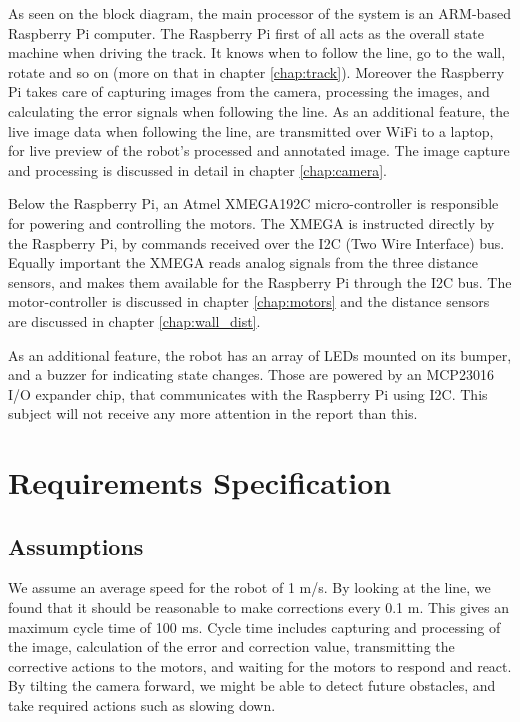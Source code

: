As seen on the block diagram, the main processor of the system is an ARM-based Raspberry Pi computer. The Raspberry Pi first of all acts as the overall state machine when driving the track. It knows when to follow the line, go to the wall, rotate and so on (more on that in chapter \ref{chap:track}). Moreover the Raspberry Pi takes care of capturing images from the camera, processing the images, and calculating the error signals when following the line. As an additional feature, the live image data when following the line, are transmitted over WiFi to a laptop, for live preview of the robot's processed and annotated image. The image capture and processing is discussed in detail in chapter \ref{chap:camera}. 

Below the Raspberry Pi, an Atmel XMEGA192C micro-controller is responsible for powering and controlling the motors. The XMEGA is instructed directly by the Raspberry Pi, by commands received over the I2C (Two Wire Interface) bus. Equally important the XMEGA reads analog signals from the three distance sensors, and makes them available for the Raspberry Pi through the I2C bus. The motor-controller is discussed in chapter \ref{chap:motors} and the distance sensors are discussed in chapter \ref{chap:wall_dist}.

As an additional feature, the robot has an array of LEDs mounted on its bumper, and a buzzer for indicating state changes. Those are powered by an MCP23016 I/O expander chip, that communicates with the Raspberry Pi using I2C. This subject will not receive any more attention in the report than this.

%
%
%
%
\section{Requirements Specification}
\subsection{Assumptions}

We assume an average speed for the robot of 1 m/s. By looking at the line, we found that it should be
reasonable to make corrections every 0.1 m. This gives an maximum cycle time of 100 ms. Cycle
time includes capturing and processing of the image, calculation of the error and correction value,
transmitting the corrective actions to the motors, and waiting for the motors to respond and react.
By tilting the camera forward, we might be able to detect future obstacles, and take required actions
such as slowing down.


